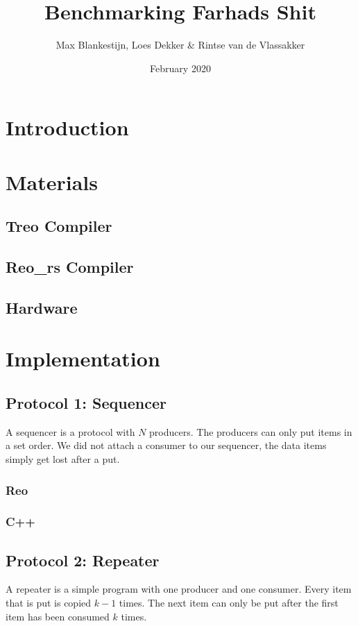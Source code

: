 \documentclass{article}
\title{Benchmarking Farhads Shit}
\author{Max Blankestijn, Loes Dekker \& Rintse van de Vlassakker}
\date{February 2020}
\begin{document}
\maketitle

\section{Introduction}

\section{Materials}
\subsection{Treo Compiler}
\subsection{Reo\_rs Compiler}
\subsection{Hardware}

\section{Implementation}
\subsection{Protocol 1: Sequencer}
A sequencer is a protocol with $N$ producers. The producers can only put items in a set order. We did not attach a consumer to our sequencer, the data items simply get lost after a put.

\subsubsection{Reo}

\subsubsection{C++}

\subsection{Protocol 2: Repeater}
A repeater is a simple program with one producer and one consumer. 
Every item that is put is copied $k-1$ times.
The next item can only be put after the first item has been consumed $k$ times.
\end{document}
